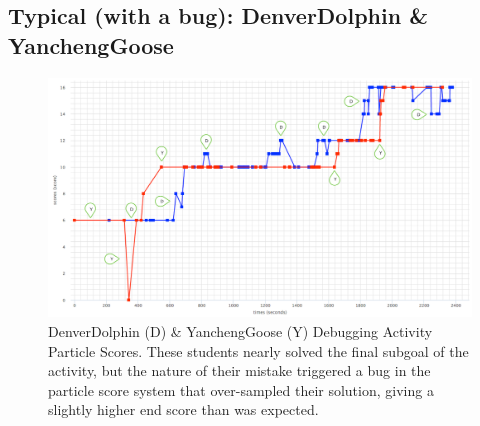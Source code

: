 \subsection{Typical (with a bug): DenverDolphin \& YanchengGoose}
\begin{figure}
	\centering
	\includegraphics[width=\textwidth]{images/stories/scores-debug-dolphin-goose-annotated}
	\caption[DenverDolphin \& YanchengGoose Debugging Activity Particle Scores]{DenverDolphin (D) \& YanchengGoose (Y) Debugging Activity Particle Scores. These students nearly solved the final subgoal of the activity, but the nature of their mistake triggered a bug in the particle score system that over-sampled their solution, giving a slightly higher end score than was expected.}
	\label{fig:dolphin_goose_chart}
\end{figure}
